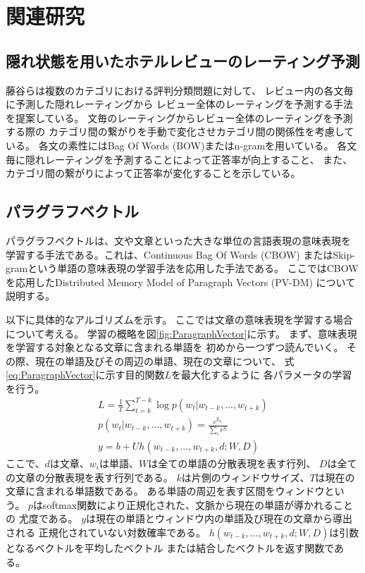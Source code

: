 \documentclass[twocolumn,a4paper]{ltjarticle}
\begin{document}
\section{関連研究}

\subsection{隠れ状態を用いたホテルレビューのレーティング予測}

藤谷ら\cite{fujitani15}は複数のカテゴリにおける評判分類問題に対して、
レビュー内の各文毎に予測した隠れレーティングから
レビュー全体のレーティングを予測する手法を提案している。
文毎のレーティングからレビュー全体のレーティングを予測する際の
カテゴリ間の繋がりを手動で変化させカテゴリ間の関係性を考慮している。
各文の素性にはBag Of Words (BOW)またはn-gramを用いている。
各文毎に隠れレーティングを予測することによって正答率が向上すること、
また、カテゴリ間の繋がりによって正答率が変化することを示している。


\subsection{パラグラフベクトル}

パラグラフベクトルは、文や文章といった大きな単位の言語表現の意味表現を
学習する手法である。これは、Continuous Bag Of Words (CBOW)
またはSkip-gramという単語の意味表現の学習手法を応用した手法である。
ここではCBOWを応用したDistributed Memory Model of Paragraph Vectors (PV-DM)
について説明する。

以下に具体的なアルゴリズムを示す。
ここでは文章の意味表現を学習する場合について考える。
学習の概略を図\ref{fig:ParagraphVector}に示す。
まず、意味表現を学習する対象となる文章に含まれる単語を
初めから一つずつ読んでいく。
その際、現在の単語及びその周辺の単語、現在の文章について、
式\ref{eq:ParagraphVector}に示す目的関数$L$を最大化するように
各パラメータの学習を行う。
\begin{gather}
  L = \frac{1}{T} \sum^{T - k}_{t = k} \log p(w_t | w_{t-k}, ..., w_{t+k})
  \label{eq:ParagraphVector} \\
  p(w_t | w_{t-k}, ..., w_{t+k}) = \frac{e^{y_{w_t}}}{\sum_i e^{y_i}} \\
  y = b + Uh(w_{t-k}, ..., w_{t+k}, d; W, D)
\end{gather}
ここで、$d$は文章、$w_i$は単語、$W$は全ての単語の分散表現を表す行列、
$D$は全ての文章の分散表現を表す行列である。
$k$は片側のウィンドウサイズ、$T$は現在の文章に含まれる単語数である。
ある単語の周辺を表す区間をウィンドウという。
$p$はsoftmax関数により正規化された、文脈から現在の単語が導かれることの
尤度である。
$y$は現在の単語とウィンドウ内の単語及び現在の文章から導出される
正規化されていない対数確率である。
$h(w_{t-k}, ..., w_{t+k}, d; W, D)$は引数となるベクトルを平均したベクトル
または結合したベクトルを返す関数である。
\end{document}
